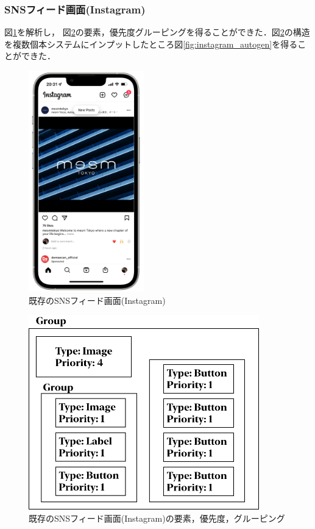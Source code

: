 \subsubsection{SNSフィード画面(Instagram)}
図\ref{fig:instagram_screenshot}を解析し， 図\ref{fig:instagram_ViewStructure}の要素，優先度グルーピングを得ることができた．図\ref{fig:instagram_ViewStructure}の構造を複数個本システムにインプットしたところ図\ref{fig:instagram_autogen}を得ることができた．


\begin{figure}[htbp]
  \begin{minipage}{\hsize}
    \begin{center}
       \includegraphics[width=50mm]{img/instagram_screenshot.png}
    \end{center}
    \caption{既存のSNSフィード画面(Instagram)}
    \label{fig:instagram_screenshot}
  \end{minipage}
\end{figure}

\begin{figure}[htbp]
  \begin{minipage}{\hsize}
    \begin{center}
       \includegraphics[width=100mm]{img/Instagram_ViewStructure.png}
    \end{center}
    \caption{既存のSNSフィード画面(Instagram)の要素，優先度，グルーピング}
    \label{fig:instagram_ViewStructure}
  \end{minipage}
\end{figure}

